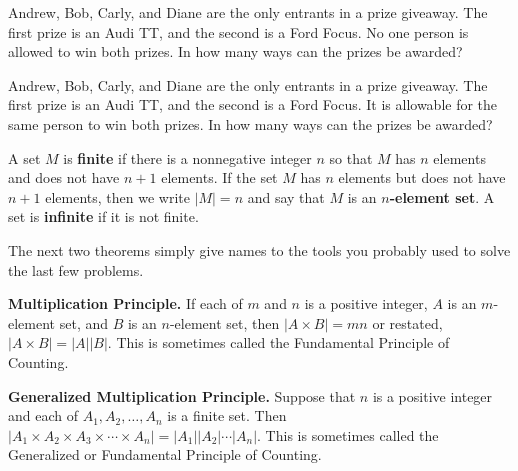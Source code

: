 \begin{prb}
\label{p2}
Andrew, Bob, Carly, and Diane are the only entrants in a prize giveaway. The first prize is an Audi TT, and the second is a Ford Focus.  No one person is allowed to win both prizes. In how many ways can the prizes be awarded?
\end{prb}

\begin{prb}
\label{p3}
Andrew, Bob, Carly, and Diane are the only entrants in a prize giveaway.  The first prize is an Audi TT, and the second is a Ford Focus.  It is allowable for the same person to win both prizes.  In how many ways can the prizes be awarded?
\end{prb}

\begin{dfn}
A set $M$ is \textbf{finite} if there is a nonnegative integer $n$ so that $M$ has $n$ elements and does not have $n+1$ elements. If the set $M$ has $n$ elements but does not have $n+1$ elements, then we write $|M| = n$ and say that $M$ is an \textbf{$n$-element set}. A set is \textbf{infinite} if it is not finite.
\end{dfn}

The next two theorems simply give names to the tools you probably used to solve the last few problems.

\begin{thm}
\label{MP}
\textbf{Multiplication Principle.} If each of $m$ and $n$ is a positive integer, $A$ is an $m$-element set, and $B$ is an $n$-element set, then  $|A \times B| = mn$ or restated, $|A \times B| = |A||B|$.  This is sometimes called the Fundamental Principle of Counting.
\end{thm}

\begin{thm}
\label{GMP}
\textbf{Generalized Multiplication Principle.}  Suppose that $n$ is a positive integer and each of $A_1, A_2, \dots ,A_n$ is a finite set.  Then $|A_1 \times A_2 \times A_3 \times \cdots \times A_n| = |A_1||A_2|\cdots|A_n|$. This is sometimes called the Generalized or Fundamental Principle of Counting.
\end{thm}

